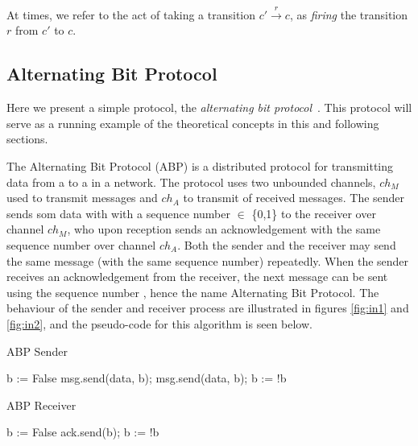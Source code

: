 At times, we refer to the act of taking a transition $c' \xrightarrow{r} c$, as \emph{firing} the transition $r$ from $c'$ to $c$.

\subsection{Alternating Bit Protocol}
Here we present a simple protocol, the \emph{alternating bit protocol}~\cite{bartlett1969note}. This protocol will serve as a running example of the theoretical concepts in this and following sections.

The Alternating Bit Protocol (ABP) is a distributed protocol for transmitting data from a  to a  in a network. The protocol uses two unbounded channels, $ch_M$ used to transmit messages and $ch_A$ to transmit  of received messages. The sender sends som data with with a sequence number  $\in$ \{0,1\} to the receiver over channel $ch_M$, who upon reception sends an acknowledgement with the same sequence number over channel $ch_A$. Both the sender and the receiver may send the same message (with the same sequence number) repeatedly. When the sender receives an acknowledgement from the receiver, the next message can be sent using the sequence number , hence the name Alternating Bit Protocol. The behaviour of the sender and receiver process are illustrated in figures \ref{fig:in1} and \ref{fig:in2}, and the pseudo-code for this algorithm is seen below.

\begin{algorithm}
  \caption{ABP Sender}
  \label{senderpseudo}
\begin{algorithmic}[1]
    \State b := False 
      \State msg.send(data, b); 
       
      \State msg.send(data, b); 
      \EndWhile
      \State b := !b 
    \EndFor
\end{algorithmic}
\end{algorithm}


\begin{algorithm}
  \caption{ABP Receiver}
  \label{senderpseudo}
\begin{algorithmic}[1]
    \State b := False 
       
      \State ack.send(b); 
      \EndWhile
      \State b := !b 
    \EndFor
\end{algorithmic}
\end{algorithm}

